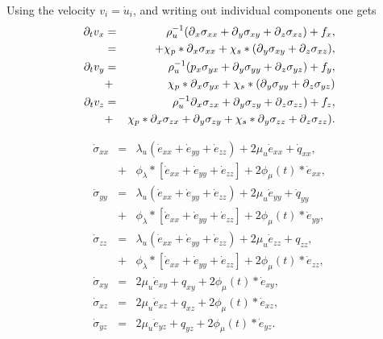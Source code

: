 \documentclass[11pt]{article}
\begin{document}
Using the velocity $v_i = \dot{u}_i$, and writing out individual components one gets
\begin{eqnarray}
  \partial_t{v}_x & = & \rho^{-1}_u(\mbox{$\partial$}_x \sigma_{xx} +\mbox{$\partial$}_y \sigma_{xy} 
                                    +\mbox{$\partial$}_z \sigma_{xz}) + f_x, \nonumber\\
            & = & + \chi_{p}*\mbox{$\partial$}_x \sigma_{xx} 
                                    +\chi_{s}*(\mbox{$\partial$}_y \sigma_{xy} 
                                    +\mbox{$\partial$}_z \sigma_{xz}),       \nonumber\\
  \partial_t{v}_y & = & \rho^{-1}_u(p_x \sigma_{yx} +\mbox{$\partial$}_y \sigma_{yy} 
                                    +\mbox{$\partial$}_z \sigma_{yz}) + f_y, \nonumber\\
            & + & \chi_{p}*\mbox{$\partial$}_x \sigma_{yx} 
                                    +\chi_{s}*(\mbox{$\partial$}_y \sigma_{yy} 
                                    +\mbox{$\partial$}_z \sigma_{yz})        \nonumber\\
  \partial_t{v}_z & = & \rho^{-1}_u\mbox{$\partial$}_x \sigma_{zx} +\mbox{$\partial$}_y \sigma_{zy} 
                                    +\mbox{$\partial$}_z \sigma_{zz}) + f_z, \nonumber\\
            & + & \chi_{p}*\mbox{$\partial$}_x \sigma_{zx} +\mbox{$\partial$}_y \sigma_{zy} 
                                    +\chi_{s}*\mbox{$\partial$}_y \sigma_{zz} 
                                    +\mbox{$\partial$}_z \sigma_{zz}).
\end{eqnarray}

\begin{eqnarray}
  \dot{\sigma}_{xx} 
     & = & \lambda_u \left (\dot{e}_{xx} 
                 + \dot{e}_{yy} + \dot{e}_{zz}\right)
                 + 2\mu_u \dot{e}_{xx} +\dot{q}_{xx},          \nonumber\\ 
     & + & \phi_{\lambda}*[\dot{e}_{xx}+\dot{e}_{yy}
                 +\dot{e}_{zz}] + 2\phi_{\mu}(t)*\dot{e}_{xx}, \nonumber\\
  \dot{\sigma}_{yy} 
     & = & \lambda_u \left (\dot{e}_{xx} 
                 +\dot{e}_{yy} + \dot{e}_{zz}\right)
                 + 2\mu_u \dot{e}_{yy} +\dot{q}_{yy}           \nonumber\\
     & + & \phi_{\lambda}*[\dot{e}_{xx}+\dot{e}_{yy}
                 +\dot{e}_{zz}] + 2\phi_{\mu}(t)*\dot{e}_{yy}, \nonumber\\
  \dot{\sigma}_{zz} 
    & = & \lambda_u \left (\dot{e}_{xx} 
                + \dot{e}_{yy} + \dot{e}_{zz}\right)
                + 2\mu_u \dot{e}_{zz} +q_{zz},                 \nonumber\\
    & + & \phi_{\lambda}*[\dot{e}_{xx}
                +\dot{e}_{yy}+\dot{e}_{zz}] 
                + 2\phi_{\mu}(t)*\dot{e}_{zz},                 \nonumber\\
  \dot{\sigma}_{xy} 
   & = & 2\mu_u \dot{e}_{xy} +q_{xy} 
                + 2\phi_{\mu}(t)*\dot{e}_{xy},                 \nonumber\\
  \dot{\sigma}_{xz} 
   & = & 2\mu_u \dot{e}_{xz} +q_{xz} 
                + 2\phi_{\mu}(t)*\dot{e}_{xz},                 \nonumber\\
  \dot{\sigma}_{yz} 
   & = & 2\mu_u \dot{e}_{yz} +q_{yz}
               +  2\phi_{\mu}(t)*\dot{e}_{yz}.                 \nonumber\\
                                      \label{eq:ve-comp}
\end{eqnarray}
\end{document}
